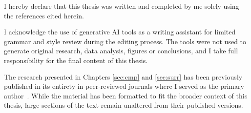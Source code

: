 %
\label{sec:declaration}
\thispagestyle{empty}

I hereby declare that this thesis was written and completed by me solely using the references cited herein.

\bigskip

I acknowledge the use of generative AI tools as a writing assistant for limited grammar and style review during the editing process. The tools were not used to generate original research, data analysis, figures or conclusions, and I take full responsibility for the final content of this thesis.

\bigskip

The research presented in Chapters \ref{sec:cmp} and \ref{sec:surr} has been previously published in its entirety in peer-reviewed journals where I served as the primary author~\cite{surr, cmp}. While the material has been formatted to fit the broader context of this thesis, large sections of the text remain unaltered from their published versions.

